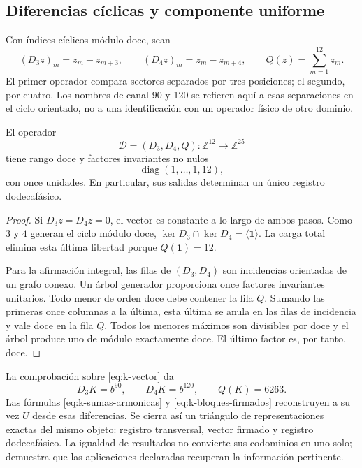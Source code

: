 \subsection{Diferencias cíclicas y componente uniforme}
\label{subsec:k-transversal}

Con índices cíclicos módulo doce, sean
\[
 (D_3z)_m=z_m-z_{m+3},\qquad(D_4z)_m=z_m-z_{m+4},
 \qquad Q(z)=\sum_{m=1}^{12}z_m.
\]
El primer operador compara sectores separados por tres posiciones; el
segundo, por cuatro. Los nombres de canal 90 y 120 se refieren aquí a
esas separaciones en el ciclo orientado, no a una identificación con un
operador físico de otro dominio.

\begin{proposition}
\label{prop:k-transversal}
El operador
\[
 \mathcal D=(D_3,D_4,Q):\mathbb Z^{12}\longrightarrow\mathbb Z^{25}
\]
tiene rango doce y factores invariantes no nulos
\[
 \operatorname{diag}(1,\ldots,1,12),
\]
con once unidades. En particular, sus salidas determinan un único registro dodecafásico.
\end{proposition}

\begin{proof}
Si \(D_3z=D_4z=0\), el vector es constante a lo largo de ambos pasos.
Como \(3\) y \(4\) generan el ciclo módulo doce,
\(\ker D_3\cap\ker D_4=\langle\mathbf1\rangle\). La carga total
elimina esta última libertad porque \(Q(\mathbf1)=12\).

Para la afirmación integral, las filas de \((D_3,D_4)\) son incidencias
orientadas de un grafo conexo. Un árbol generador proporciona once
factores invariantes unitarios. Todo menor de orden doce debe contener la
fila \(Q\). Sumando las primeras once columnas a la última, esta última
se anula en las filas de incidencia y vale doce en la fila \(Q\). Todos
los menores máximos son divisibles por doce y el árbol produce uno de
módulo exactamente doce. El último factor es, por tanto, doce.
\end{proof}

La comprobación sobre \eqref{eq:k-vector} da
\[
 D_3K=b^{90},\qquad D_4K=b^{120},\qquad Q(K)=6263.
\]
Las fórmulas \eqref{eq:k-sumas-armonicas} y
\eqref{eq:k-bloques-firmados} reconstruyen a su vez \(U\) desde esas
diferencias. Se cierra así un triángulo de representaciones exactas del
mismo objeto: registro transversal, vector firmado y registro dodecafásico. La igualdad
de resultados no convierte sus codominios en uno solo; demuestra que
las aplicaciones declaradas recuperan la información pertinente.


